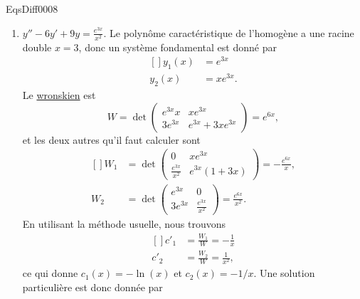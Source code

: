 
\begin{corrige}{EqsDiff0008}

\begin{enumerate}

\item
$y''-6y'+9y=\frac{  e^{3x} }{ x^2 }$. Le polynôme caractéristique de l'homogène a une racine double $x=3$, donc un système fondamental est donné par
\begin{equation}
	\begin{aligned}[]
		y_1(x)&= e^{3x}\\
		y_2(x)&= xe^{3x}.
	\end{aligned}
\end{equation}
Le \href{http://fr.wikipedia.org/wiki/Wronskien}{wronskien} est
\begin{equation}
	W=\det\begin{pmatrix}
	 e^{3x}x &	x e^{3x}	\\ 
	3 e^{3x}	&	 e^{3x}+3x e^{3x}
\end{pmatrix}= e^{6x},
\end{equation}
et les deux autres qu'il faut calculer sont
\begin{equation}
	\begin{aligned}[]
		W_1&=\det\begin{pmatrix}
	0	&	x e^{3x}	\\ 
	\frac{  e^{3x} }{ x^2 }	&	 e^{3x}(1+3x)	
\end{pmatrix}=-\frac{  e^{6x} }{ x },\\
		W_2&=\det\begin{pmatrix}
	 e^{3x}	&	0	\\ 
	3 e^{3x}	&	\frac{  e^{3x} }{ x^2 }
\end{pmatrix}=\frac{  e^{6x} }{ x^2 }.
	\end{aligned}
\end{equation}
En utilisant la méthode usuelle, nous trouvons	
\begin{equation}
	\begin{aligned}[]
		c'_1&=\frac{ W_1 }{ W }=-\frac{1}{ x }\\
		c'_2&=\frac{ W_2 }{ W }=\frac{1}{ x^2 },
	\end{aligned}
\end{equation}
ce qui donne $c_1(x)=-\ln(x)$ et $c_2(x)=-1/x$. Une solution particulière est donc donnée par
\begin{equation}

\end{equation}
\end{enumerate}
\end{corrige}
